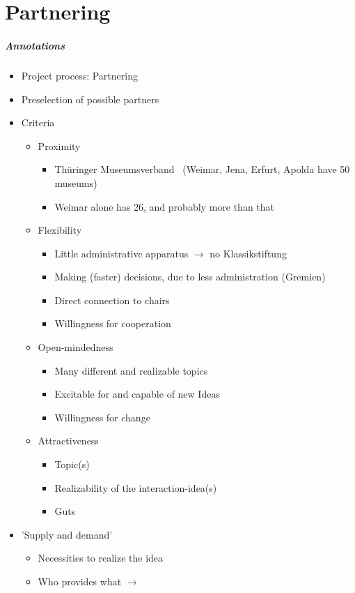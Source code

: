 \chapter{Partnering}
\label{partnering}



\paragraph{Annotations}

\begin{itemize}
	\item Project process: Partnering
	\\
	\item Preselection of possible partners
	\item Criteria
	\begin{itemize}
		\item Proximity
		\begin{itemize}
			\item Thüringer Museumsverband~\cite{ThueringerMuseumsverbandOrte} (Weimar, Jena, Erfurt, Apolda have 50 museums)
			\item Weimar alone has 26, and probably more than that
		\end{itemize}
		\item Flexibility
		\begin{itemize}
			\item Little administrative apparatus $\to$ no Klassikstiftung
			\item Making (faster) decisions, due to less administration (Gremien)
			\item Direct connection to chairs
			\item Willingness for cooperation
		\end{itemize}
		\item Open-mindedness
		\begin{itemize}
			\item Many different and realizable topics
			\item Excitable for and capable of new Ideas
			\item Willingness for change
		\end{itemize}
		\item Attractiveness
		\begin{itemize}
			\item Topic(s)
			\item Realizability of the interaction-idea(s)
			\item Guts
		\end{itemize}
	\end{itemize}
	\item 'Supply and demand'
	\begin{itemize}
		\item Necessities to realize the idea
		\item Who provides what $\to$
	\end{itemize}
\end{itemize}

